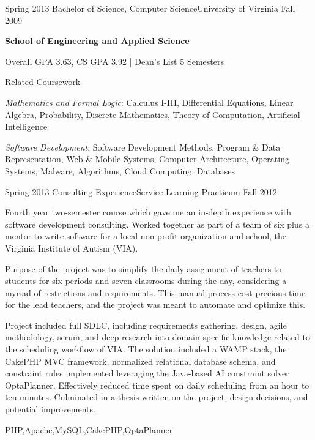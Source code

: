 \begin{scholarship}
  \experience
    {Spring 2013}   {Bachelor of Science, Computer Science}{University of Virginia}
    {Fall 2009}
                    {
                        \textbf{School of Engineering and Applied Science}

                        Overall GPA 3.63, CS GPA 3.92 | Dean's List 5 Semesters 

                        \textcolor{accentcolor}{Related Coursework}

                        \textit{Mathematics and Formal Logic}: Calculus I-III, Differential Equations, Linear Algebra, Probability, Discrete Mathematics, Theory of Computation, Artificial Intelligence

                        \textit{Software Development}: Software Development Methods, Program \& Data Representation, Web \& Mobile Systems, Computer Architecture, Operating Systems, Malware, Algorithms, Cloud Computing, Databases
                    }
                    {}
\end{scholarship}

\begin{scholarship}
  \experience
    {Spring 2013}  {Consulting Experience}{Service-Learning Practicum}
    {Fall 2012}    {
                        Fourth year two-semester course which gave me an in-depth experience with software development consulting. Worked together as part of a team of six plus a mentor to write software for a local non-profit organization and school, the Virginia Institute of Autism (VIA).

                        \vspace{0.5em}

                        Purpose of the project was to simplify the daily assignment of teachers to students for six periods and seven classrooms during the day, considering a myriad of restrictions and requirements. This manual process cost precious time for the lead teachers, and the project was meant to automate and optimize this.

                        \vspace{0.5em}

                        Project included full SDLC, including requirements gathering, design, agile methodology, scrum, and deep research into domain-specific knowledge related to the scheduling workflow of VIA. The solution included a WAMP stack, the CakePHP MVC framework, normalized relational database schema, and constraint rules implemented leveraging the Java-based AI constraint solver OptaPlanner. Effectively reduced time spent on daily scheduling from an hour to ten minutes. Culminated in a thesis written on the project, design decisions, and potential improvements.
                    }
                    {PHP,Apache,MySQL,CakePHP,OptaPlanner}
\end{scholarship}
\filbreak